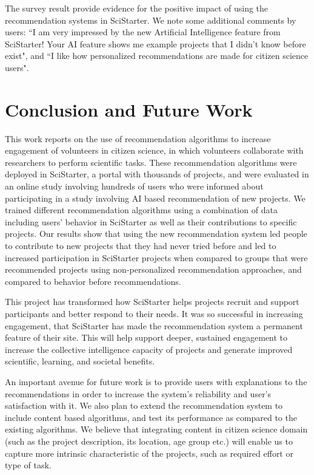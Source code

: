 \documentclass[letterpaper]{article} %
\begin{document}
The survey  result provide evidence for the positive impact of using the recommendation systems in  SciStarter. We note some additional comments by users: ``I am very impressed by the new Artificial Intelligence feature from SciStarter! Your AI feature shows me example projects that I didn't know before exist", and ``I like how personalized recommendations are made for citizen science users".

 

\section{Conclusion and Future Work}
 

This work reports on the use of recommendation algorithms to increase engagement of volunteers in citizen science, in which volunteers collaborate with researchers to perform scientific tasks. 
These recommendation algorithms were deployed in   SciStarter, a portal with thousands of  projects,  and were evaluated in an online study involving hundreds of users who were informed about participating in a study involving AI based recommendation of new projects. 
 We trained different recommendation algorithms using a combination of data including   users' behavior in SciStarter as well as their contributions to specific projects.  Our results show that using the new recommendation system  led people to contribute to  new projects that they had never tried before and  led to increased participation in SciStarter projects when compared to groups that were
recommended projects using non-personalized recommendation
approaches, and compared to behavior before recommendations. 
 
 
 This project has transformed how SciStarter helps projects recruit and support participants and better respond to their needs. It was so successful in increasing engagement, that SciStarter has made the recommendation system a permanent feature of their site. This will help support deeper, sustained engagement to increase the collective intelligence capacity of projects and generate improved scientific, learning, and societal benefits.  
%

An important avenue for future work is to provide 
users with explanations   to the recommendations in order to increase the system's reliability and user's satisfaction with it.  We also  plan to extend the recommendation system to include content based algorithms, and test its performance as compared to the existing algorithms. We believe that integrating content in citizen science domain (such as the project description, its location, age group etc.)  will enable us to 
 capture more intrinsic characteristic of the projects, such as required effort or type of task.
\end{document}
